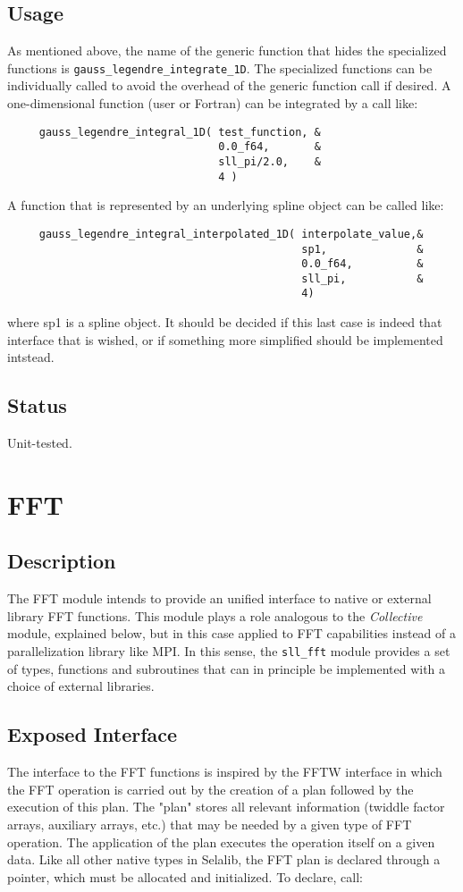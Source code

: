 \documentclass[]{report}   %
\begin{document}
\subsection{Usage}
As mentioned above, the name of the generic function that hides the specialized functions is \verb+gauss_legendre_integrate_1D+. The specialized functions can be individually called to avoid the overhead of the generic function call if desired. A one-dimensional function (user or Fortran) can be integrated by a call like:
\begin{verbatim}
     gauss_legendre_integral_1D( test_function, &
                                 0.0_f64,       &
                                 sll_pi/2.0,    &
                                 4 )
\end{verbatim}
A function that is represented by an underlying spline object can be called like:
\begin{verbatim}
     gauss_legendre_integral_interpolated_1D( interpolate_value,&
                                              sp1,              &
                                              0.0_f64,          &
                                              sll_pi,           &
                                              4)
\end{verbatim}
where sp1 is a spline object. It should be decided if this last case is indeed that interface that is wished, or if something more simplified should be implemented intstead.
\subsection{Status}
Unit-tested.


\section{FFT}
\subsection{Description}
The FFT module intends to provide an unified interface to native or external library FFT functions. This module plays a role analogous to the \emph{Collective} module, explained below, but in this case applied to FFT capabilities instead of a parallelization library like MPI. In this sense, the \verb+sll_fft+ module provides a set of types, functions and subroutines that can in principle be implemented with a choice of external libraries.

\subsection{Exposed Interface}
The interface to the FFT functions is inspired by the FFTW interface in which the FFT operation is carried out by the creation of a plan followed by the execution of this plan. The "plan" stores all relevant information (twiddle factor arrays, auxiliary arrays, etc.) that may be needed by a given type of FFT operation. The application of the plan executes the operation itself on a given data. Like all other native types in Selalib, the FFT plan is declared through a pointer, which must be allocated and initialized. To declare, call:
\end{document}
